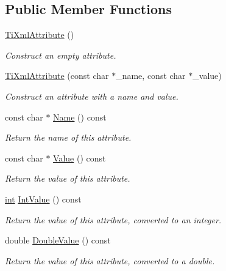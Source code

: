 \subsection*{Public Member Functions}
\begin{DoxyCompactItemize}
\item 
\hyperlink{class_ti_xml_attribute_a9cfa3c8179873fd485d83003b114f8e1}{Ti\-Xml\-Attribute} ()
\begin{DoxyCompactList}\small\item\em Construct an empty attribute. \end{DoxyCompactList}\item 
\hyperlink{class_ti_xml_attribute_a759d0b76fb8fcf765ecab243bc14f05e}{Ti\-Xml\-Attribute} (const char $\ast$\-\_\-name, const char $\ast$\-\_\-value)
\begin{DoxyCompactList}\small\item\em Construct an attribute with a name and value. \end{DoxyCompactList}\item 
const char $\ast$ \hyperlink{class_ti_xml_attribute_a298a57287d305904ba6bd96ae6f78d3d}{Name} () const 
\begin{DoxyCompactList}\small\item\em Return the name of this attribute. \end{DoxyCompactList}\item 
const char $\ast$ \hyperlink{class_ti_xml_attribute_a0f874490eac8ca00ee0070765d0e97e3}{Value} () const 
\begin{DoxyCompactList}\small\item\em Return the value of this attribute. \end{DoxyCompactList}\item 
\hyperlink{wglew_8h_a500a82aecba06f4550f6849b8099ca21}{int} \hyperlink{class_ti_xml_attribute_aa1a20ad59dc7e89a0ab265396360d50f}{Int\-Value} () const 
\begin{DoxyCompactList}\small\item\em Return the value of this attribute, converted to an integer. \end{DoxyCompactList}\item 
double \hyperlink{class_ti_xml_attribute_a2880ddef53fc7522c99535273954d230}{Double\-Value} () const 
\begin{DoxyCompactList}\small\item\em Return the value of this attribute, converted to a double. \end{DoxyCompactList}\item 

\end{DoxyCompactItemize}
